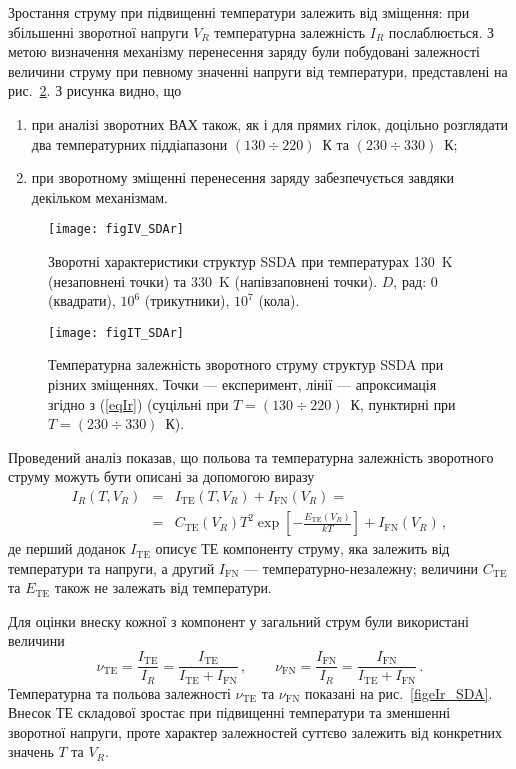 Зростання струму при підвищенні температури залежить від зміщення:
при збільшенні зворотної напруги $V_R$ температурна залежність $I_R$ послаблюється.
З метою визначення механізму перенесення заряду були побудовані залежності величини струму при певному значенні напруги від температури,
представлені на рис.~\ref{figIT_SDAr}.
З рисунка видно, що
\begin{enumerate}[label=\asbuk*),leftmargin=0em,itemindent=1.5em]
\item при аналізі зворотних ВАХ також, як і для прямих гілок, доцільно розглядати два температурних піддіапазони $(130\div220)$~К та $(230\div330)$~К;
\item при зворотному зміщенні перенесення заряду забезпечується завдяки декільком механізмам.
\end{enumerate}



\begin{figure}
\center
\texttt{[image: figIV\_SDAr]}
\caption{\label{figIV_SDAr}
Зворотні характеристики структур SSDA при температурах 130~K (незаповнені точки)
та 330~K (напівзаповнені точки).
$D$, рад: 0 (квадрати), $10^6$ (трикутники), $10^7$ (кола).
}%
\end{figure}


\begin{figure}
\center
\texttt{[image: figIT\_SDAr]}
\caption{\label{figIT_SDAr}
Температурна залежність зворотного струму структур SSDA при різних зміщеннях.
Точки --- експеримент, лінії --- апроксимація згідно з (\ref{eqIr})
(суцільні при $T=(130\div220)$~К, пунктирні при $T=(230\div330)$~К).
}%
\end{figure}

Проведений аналіз показав, що польова та температурна залежність зворотного струму можуть бути описані
за допомогою виразу
\begin{eqnarray}
\label{eqIr}
\nonumber I_R(T,V_R)&=&I_\mathrm{TE}(T,V_R)+I_\mathrm{FN}(V_R)=\\
&=&C_\mathrm{TE}(V_R)T^2\exp\left[-\frac{E_\mathrm{TE}(V_R)}{kT}\right]+I_\mathrm{FN}(V_R)\,,
\end{eqnarray}
де перший доданок $I_\mathrm{TE}$ описує ТЕ компоненту струму, яка залежить від температури та напруги,
а другий $I_\mathrm{FN}$ --- температурно-незалежну;
величини  $C_\mathrm{TE}$ та $E_\mathrm{TE}$ також не залежать від температури.

\label{nu_IR}
Для оцінки внеску кожної з компонент у загальний струм були використані величини
\begin{equation*}
 \nu_\mathrm{TE}=\frac{I_\mathrm{TE}}{I_R}=\frac{I_\mathrm{TE}}{I_\mathrm{TE}+I_\mathrm{FN}}\,,\qquad
 \nu_\mathrm{FN}=\frac{I_\mathrm{FN}}{I_R}=\frac{I_\mathrm{FN}}{I_\mathrm{TE}+I_\mathrm{FN}}\,.
\end{equation*}
Температурна та польова залежності $\nu_\mathrm{TE}$ та $\nu_\mathrm{FN}$ показані на рис.~\ref{figeIr_SDA}.
Внесок ТЕ складової зростає при підвищенні температури та зменшенні зворотної напруги, проте характер
залежностей суттєво залежить від конкретних значень $T$ та $V_R$.


